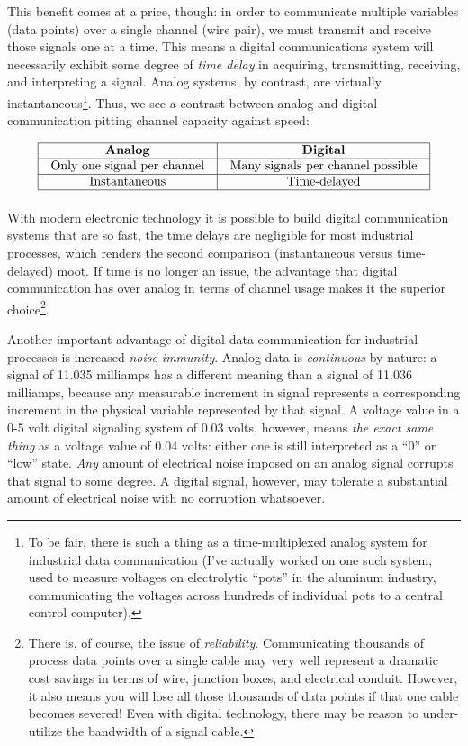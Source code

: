 This benefit comes at a price, though: in order to communicate multiple variables (data points) over a single channel (wire pair), we must transmit and receive those signals one at a time.  This means a digital communications system will necessarily exhibit some degree of \textit{time delay} in acquiring, transmitting, receiving, and interpreting a signal.  Analog systems, by contrast, are virtually instantaneous\footnote{To be fair, there is such a thing as a time-multiplexed analog system for industrial data communication (I've actually worked on one such system, used to measure voltages on electrolytic ``pots'' in the aluminum industry, communicating the voltages across hundreds of individual pots to a central control computer).}.  Thus, we see a contrast between analog and digital communication pitting channel capacity against speed:


$$\vbox{\offinterlineskip
\halign{\strut
\vrule \quad\hfil # \ \hfil & 
\vrule \quad\hfil # \ \hfil \vrule \cr
\noalign{\hrule}
%
\textbf{Analog} & \textbf{Digital} \cr
%
\noalign{\hrule}
%
Only one signal per channel & Many signals per channel possible \cr
%
\noalign{\hrule}
%
Instantaneous & Time-delayed \cr
%
\noalign{\hrule}
} %
}$$ %

With modern electronic technology it is possible to build digital communication systems that are so fast, the time delays are negligible for most industrial processes, which renders the second comparison (instantaneous versus time-delayed) moot.  If time is no longer an issue, the advantage that digital communication has over analog in terms of channel usage makes it the superior choice\footnote{There is, of course, the issue of \textit{reliability}.  Communicating thousands of process data points over a single cable may very well represent a dramatic cost savings in terms of wire, junction boxes, and electrical conduit.  However, it also means you will lose all those thousands of data points if that one cable becomes severed!  Even with digital technology, there may be reason to under-utilize the bandwidth of a signal cable.}.

\vskip 10pt

Another important advantage of digital data communication for industrial processes is increased \textit{noise immunity}.  Analog data is \textit{continuous} by nature: a signal of 11.035 milliamps has a different meaning than a signal of 11.036 milliamps, because any measurable increment in signal represents a corresponding increment in the physical variable represented by that signal.  A voltage value in a 0-5 volt digital signaling system of 0.03 volts, however, means \textit{the exact same thing} as a voltage value of 0.04 volts: either one is still interpreted as a ``0'' or ``low'' state.  \textit{Any} amount of electrical noise imposed on an analog signal corrupts that signal to some degree.  A digital signal, however, may tolerate a substantial amount of electrical noise with no corruption whatsoever.    

